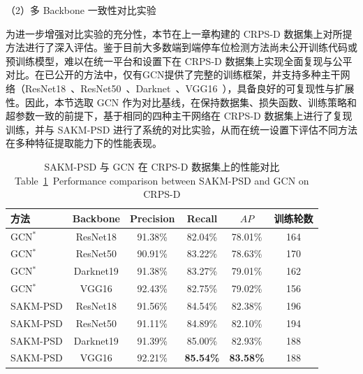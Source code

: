 （2）多 Backbone 一致性对比实验

为进一步增强对比实验的充分性，本节在上一章构建的 CRPS-D 数据集上对所提方法进行了深入评估。鉴于目前大多数端到端停车位检测方法尚未公开训练代码或预训练模型，难以在统一平台和设置下在 CRPS-D 数据集上实现全面复现与公平对比。在已公开的方法中，仅有GCN\cite{min2021attentional}提供了完整的训练框架，并支持多种主干网络（ResNet18~\cite{kaiming2016deep}、ResNet50~\cite{kaiming2016deep}、Darknet~\cite{redmon2017yolo9000}、VGG16~\cite{simonyan2014very}），具备良好的可复现性与扩展性。因此，本节选取 GCN 作为对比基线，在保持数据集、损失函数、训练策略和超参数一致的前提下，基于相同的四种主干网络在 CRPS-D 数据集上进行了复现训练，并与 SAKM-PSD 进行了系统的对比实验，从而在统一设置下评估不同方法在多种特征提取能力下的性能表现。

\begin{table}[!h]
\centering
\setlength{\tabcolsep}{4mm}
\caption{SAKM-PSD 与 GCN\cite{min2021attentional} 在 CRPS-D 数据集上的性能对比 \\
Table~\ref{tab_2crps}~Performance comparison between SAKM-PSD and GCN\cite{min2021attentional} on CRPS-D}
    \begin{tabular}{lccccc}
        \toprule
         方法 & Backbone & Precision & Recall & $AP$  & 训练轮数\\
        \midrule
            GCN$^{*}$\cite{min2021attentional}  & ResNet18  & 91.38\% & 82.04\% & 78.01\%  & 164\\

             GCN$^{*}$\cite{min2021attentional}  & ResNet50  & 90.91\%	& 83.22\%	& 78.63\%  & 170 \\
              GCN$^{*}$\cite{min2021attentional}  & Darknet19  & 91.38\%	& 83.27\%	& 79.01\%  & 162 \\
              GCN$^{*}$\cite{min2021attentional}  & VGG16  & 92.43\%	& 82.75\%	& 79.02\%  & 156 \\

             SAKM-PSD  & ResNet18  &  91.56\%	& 84.54\%	& 82.38\%  & 196\\
             SAKM-PSD  & ResNet50  &  91.11\%	& 84.89\%	& 82.10\%  & 194 \\
             SAKM-PSD  & Darknet19  &  91.39\%	& 85.00\%	& 82.93\%  & 188 \\
             SAKM-PSD  & VGG16  &  92.21\%	& \textbf{85.54\%}	& \textbf{83.58\%}  & 188 \\    
        \bottomrule
    \end{tabular}
    \label{tab_2crps}
\end{table}

